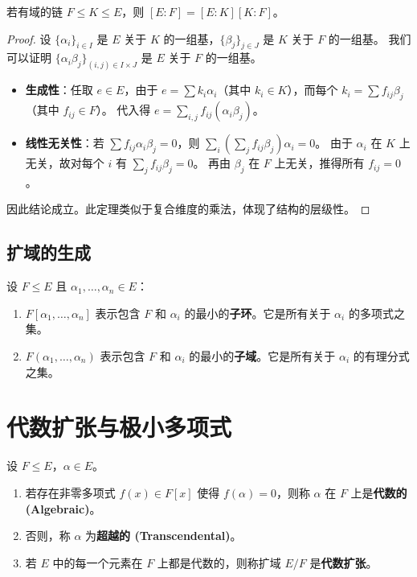 \documentclass[11pt]{article}
\begin{document}
\begin{cntheorem}
若有域的链 $F \le K \le E$，则 $[E:F] = [E:K][K:F]$。
\end{cntheorem}
\begin{proof}
设 $\{\alpha_i\}_{i \in I}$ 是 $E$ 关于 $K$ 的一组基，$\{\beta_j\}_{j \in J}$ 是 $K$ 关于 $F$ 的一组基。
我们可以证明 $\{\alpha_i \beta_j\}_{(i,j) \in I \times J}$ 是 $E$ 关于 $F$ 的一组基。
\begin{itemize}
    \item \textbf{生成性}：任取 $e \in E$，由于 $e = \sum k_i \alpha_i$（其中 $k_i \in K$），而每个 $k_i = \sum f_{ij} \beta_j$（其中 $f_{ij} \in F$）。
    代入得 $e = \sum_{i,j} f_{ij} (\alpha_i \beta_j)$。
    \item \textbf{线性无关性}：若 $\sum f_{ij} \alpha_i \beta_j = 0$，则 $\sum_i (\sum_j f_{ij} \beta_j) \alpha_i = 0$。
    由于 $\alpha_i$ 在 $K$ 上无关，故对每个 $i$ 有 $\sum_j f_{ij} \beta_j = 0$。
    再由 $\beta_j$ 在 $F$ 上无关，推得所有 $f_{ij} = 0$。
\end{itemize}
因此结论成立。此定理类似于复合维度的乘法，体现了结构的层级性。
\end{proof}

\subsection{扩域的生成}

设 $F \le E$ 且 $\alpha_1, \dots, \alpha_n \in E$：
\begin{enumerate}
    \item $F[\alpha_1, \dots, \alpha_n]$ 表示包含 $F$ 和 $\alpha_i$ 的最小的\textbf{子环}。它是所有关于 $\alpha_i$ 的多项式之集。
    \item $F(\alpha_1, \dots, \alpha_n)$ 表示包含 $F$ 和 $\alpha_i$ 的最小的\textbf{子域}。它是所有关于 $\alpha_i$ 的有理分式之集。
\end{enumerate}

\section{代数扩张与极小多项式}

\begin{cndefinition}[代数元与超越元]
设 $F \le E$，$\alpha \in E$。
\begin{enumerate}
    \item 若存在非零多项式 $f(x) \in F[x]$ 使得 $f(\alpha) = 0$，则称 $\alpha$ 在 $F$ 上是\textbf{代数的 (Algebraic)}。
    \item 否则，称 $\alpha$ 为\textbf{超越的 (Transcendental)}。
    \item 若 $E$ 中的每一个元素在 $F$ 上都是代数的，则称扩域 $E/F$ 是\textbf{代数扩张}。
\end{enumerate}
\end{cndefinition}
\end{document}
